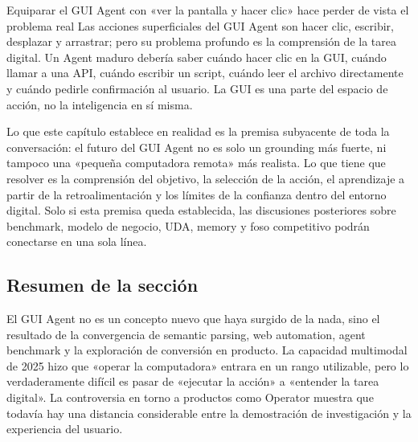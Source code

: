\begin{warningbox}{Equiparar el GUI Agent con «ver la pantalla y hacer clic» hace perder de vista el problema real}
Las acciones superficiales del GUI Agent son hacer clic, escribir, desplazar y arrastrar; pero su problema profundo es la comprensión de la tarea digital. Un Agent maduro debería saber cuándo hacer clic en la GUI, cuándo llamar a una API, cuándo escribir un script, cuándo leer el archivo directamente y cuándo pedirle confirmación al usuario. La GUI es una parte del espacio de acción, no la inteligencia en sí misma.
\end{warningbox}

Lo que este capítulo establece en realidad es la premisa subyacente de toda la conversación: el futuro del GUI Agent no es solo un grounding más fuerte, ni tampoco una «pequeña computadora remota» más realista. Lo que tiene que resolver es la comprensión del objetivo, la selección de la acción, el aprendizaje a partir de la retroalimentación y los límites de la confianza dentro del entorno digital. Solo si esta premisa queda establecida, las discusiones posteriores sobre benchmark, modelo de negocio, UDA, memory y foso competitivo podrán conectarse en una sola línea.

\subsection{Resumen de la sección}

El GUI Agent no es un concepto nuevo que haya surgido de la nada, sino el resultado de la convergencia de semantic parsing, web automation, agent benchmark y la exploración de conversión en producto. La capacidad multimodal de 2025 hizo que «operar la computadora» entrara en un rango utilizable, pero lo verdaderamente difícil es pasar de «ejecutar la acción» a «entender la tarea digital». La controversia en torno a productos como Operator muestra que todavía hay una distancia considerable entre la demostración de investigación y la experiencia del usuario.
